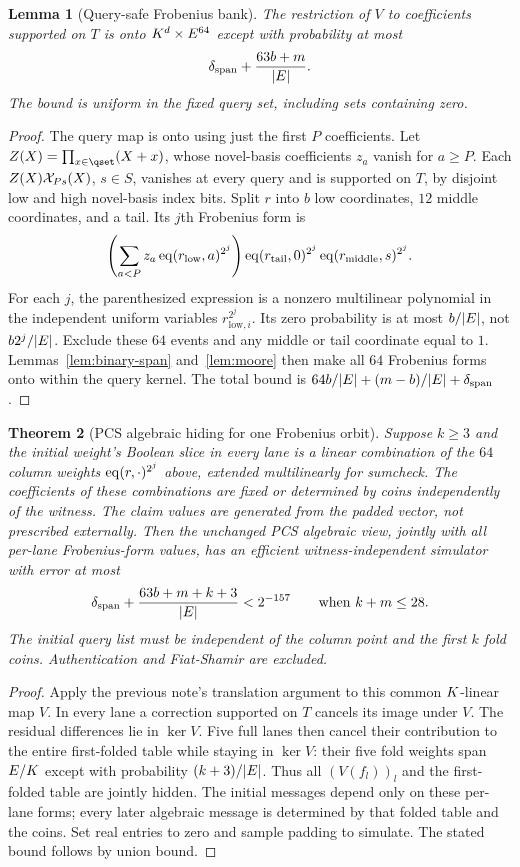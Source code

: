 \documentclass[11pt]{article}
\newtheorem{lemma}{Lemma}
\newtheorem{theorem}[lemma]{Theorem}
\begin{document}
\begin{lemma}[Query-safe Frobenius bank]\label{lem:ring-bank}
The restriction of $V$ to coefficients supported on $T$ is onto $K^d\times E^{64}$ except with probability at most
\[
 \delta_{\mathrm{span}}+\frac{63b+m}{|E|}.
\]
The bound is uniform in the fixed query set, including sets containing zero.
\end{lemma}
\begin{proof}
The query map is onto using just the first $P$ coefficients. Let $Z(X)=\prod_{x\in\qset}(X+x)$, whose novel-basis coefficients $z_a$ vanish for $a\ge P$. Each $Z(X)\mathcal{X}_{Ps}(X)$, $s\in S$, vanishes at every query and is supported on $T$, by disjoint low and high novel-basis index bits. Split $r$ into $b$ low coordinates, $12$ middle coordinates, and a tail. Its $j$th Frobenius form is
\[
 \left(\sum_{a<P}z_a\operatorname{eq}(r_{\mathrm{low}},a)^{2^j}\right)
 \operatorname{eq}(r_{\mathrm{tail}},0)^{2^j}\operatorname{eq}(r_{\mathrm{middle}},s)^{2^j}.
\]
For each $j$, the parenthesized expression is a nonzero multilinear polynomial in the independent uniform variables $r_{\mathrm{low},i}^{2^j}$. Its zero probability is at most $b/|E|$, not $b2^j/|E|$. Exclude these $64$ events and any middle or tail coordinate equal to $1$. Lemmas~\ref{lem:binary-span} and~\ref{lem:moore} then make all $64$ Frobenius forms onto within the query kernel. The total bound is $64b/|E|+(m-b)/|E|+\delta_{\mathrm{span}}$.
\end{proof}

\begin{theorem}[PCS algebraic hiding for one Frobenius orbit]\label{thm:ring-pcs}
Suppose $k\ge3$ and the initial weight's Boolean slice in every lane is a linear combination of the $64$ column weights $\operatorname{eq}(r,\cdot)^{2^j}$ above, extended multilinearly for sumcheck. The coefficients of these combinations are fixed or determined by coins independently of the witness. The claim values are generated from the padded vector, not prescribed externally. Then the unchanged PCS algebraic view, jointly with all per-lane Frobenius-form values, has an efficient witness-independent simulator with error at most
\[
 \delta_{\mathrm{span}}+\frac{63b+m+k+3}{|E|}<2^{-157}
 \qquad\text{when }k+m\le28.
\]
The initial query list must be independent of the column point and the first $k$ fold coins. Authentication and Fiat-Shamir are excluded.
\end{theorem}
\begin{proof}
Apply the previous note's translation argument to this common $K$-linear map $V$. In every lane a correction supported on $T$ cancels its image under $V$. The residual differences lie in $\ker V$. Five full lanes then cancel their contribution to the entire first-folded table while staying in $\ker V$: their five fold weights span $E/K$ except with probability $(k+3)/|E|$. Thus all $(V(f_l))_l$ and the first-folded table are jointly hidden. The initial messages depend only on these per-lane forms; every later algebraic message is determined by that folded table and the coins. Set real entries to zero and sample padding to simulate. The stated bound follows by union bound.
\end{proof}
\end{document}
